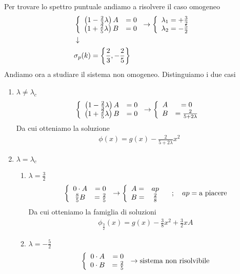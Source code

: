Per trovare lo spettro puntuale andiamo a risolvere il caso omogeneo
\begin{align}
	&\left\{ \begin{array}{cc} \left( 1 - \frac{2}{3}\lambda \right) A &=0\\ \left( 1 + \frac{2}{5}\lambda \right) B &= 0 \end{array} \right. \to \left\{ \begin{array}{cc} \lambda_1 = +\frac{3}{2}\\ \lambda_2 = -\frac{5}{2} \end{array} \right. \\ &\downarrow \nonumber \\
	&\sigma_p(k) = \left\{ \frac{2}{3} , -\frac{2}{5} \right\}
\end{align}
Andiamo ora a studiare il sistema non omogeneo. Distinguiamo i due casi
\begin{enumerate}
	\item $\lambda \neq \lambda_c$
	\begin{align}
		\left\{ \begin{array}{cc} \left( 1 - \frac{2}{3}\lambda \right) A &=0\\ \left( 1 + \frac{2}{5}\lambda \right) B &= 0 \end{array} \right. \to \left\{ \begin{array}{cc} A &=0\\ B &= \frac{2}{5+2\lambda} \end{array} \right.
	\end{align}
	Da cui otteniamo la soluzione
	\begin{align}
		\phi(x) = g(x) - \frac{2}{5+2\lambda} x^2
	\end{align}
	\newpage
	\item $\lambda = \lambda_c$
	\begin{enumerate}
		\item $\lambda=\frac{3}{2}$
		\begin{align}
			\left\{ \begin{array}{cc} 0\cdot A &=0\\ \frac{8}{5} B &= \frac{2}{5} \end{array} \right. \to \left\{ \begin{array}{cc} A = &ap\\ B = &\frac{2}{8} \end{array} \right. \quad ; \quad ap = \text{a piacere}
		\end{align}
		Da cui otteniamo la famiglia di soluzioni
		\begin{align}
			\phi_{\frac{3}{2}}(x) = g(x) - \frac{3}{8} x^2 + \frac{3}{2}xA 
		\end{align}
		\item $\lambda=-\frac{5}{2}$
		\begin{align}
			\left\{ \begin{array}{cc} 0\cdot A &=0\\ 0\cdot B &= \frac{2}{5} \end{array} \right. \to \text{sistema non risolvibile}
		\end{align}
		
	\end{enumerate}
\end{enumerate}

\newpage
